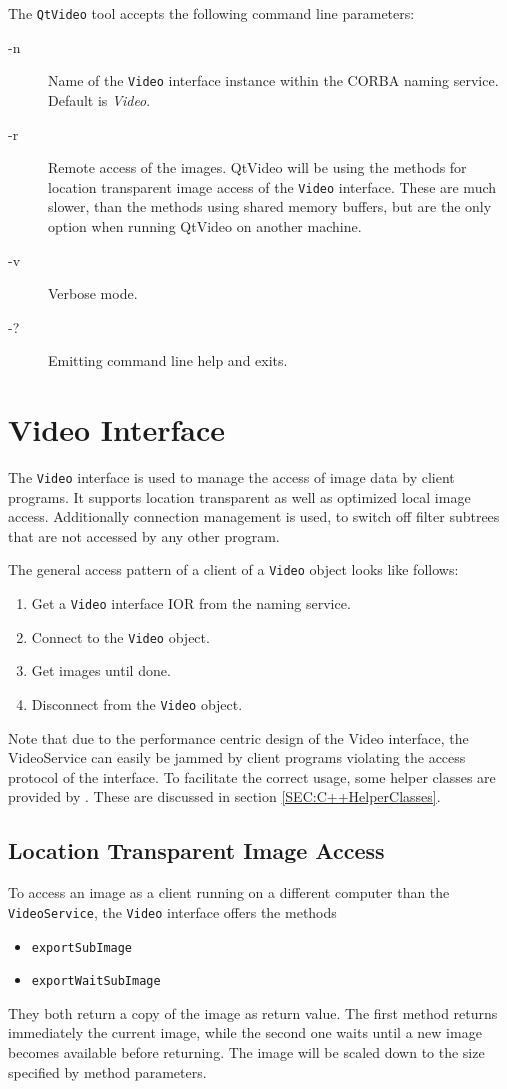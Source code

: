 The {\tt QtVideo} tool accepts the following command line parameters:
\begin{description}
\item[-n] Name of the {\tt Video} interface instance within the CORBA
  naming service. Default is {\em Video}.
\item[-r] Remote access of the images. QtVideo will be using the
  methods for location transparent image access of the {\tt Video}
  interface. These are much slower, than the methods using shared
  memory buffers, but are the only option when running QtVideo on
  another machine.
\item[-v] Verbose mode.
\item[-?] Emitting command line help and exits.
\end{description}

\section{Video Interface}

The {\tt Video} interface is used to manage the access of image data
by client programs. It supports location transparent as well as
optimized local image access. Additionally connection management is
used, to switch off filter subtrees that are not accessed by any other
program.

The general access pattern of a client of a {\tt Video} object looks
like follows:
\begin{enumerate}
\item Get a {\tt Video} interface IOR from the naming service.
\item Connect to the {\tt Video} object.
\item Get images until done.
\item Disconnect from the {\tt Video} object.
\end{enumerate}

Note that due to the performance centric design of the Video
interface, the VideoService can easily be jammed by client programs
violating the access protocol of the interface. To facilitate the
correct usage, some helper classes are provided by \miro. These are
discussed in section \ref{SEC:C++HelperClasses}.

\subsection{Location Transparent Image Access}

To access an image as a client running on a different computer than
the {\tt VideoService}, the {\tt Video} interface offers the methods
\begin{itemize}
\item {\tt exportSubImage}
\item {\tt exportWaitSubImage}
\end{itemize}
They both return a copy of the image as return value. The first method
returns immediately the current image, while the second one waits until
a new image becomes available before returning. The image will be
scaled down to the size specified by method parameters.

